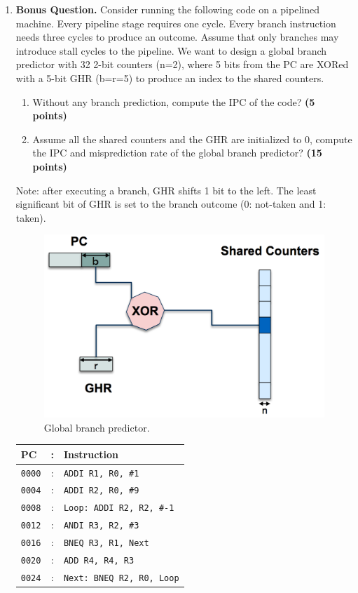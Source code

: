 \documentclass[a4paper, 11pt]{exam}
\begin{document}
\begin{enumerate}
\item \textbf{Bonus Question.}
Consider running the following code on a pipelined machine. Every pipeline stage requires one cycle. Every branch instruction needs three cycles to produce an outcome. Assume that only branches may introduce stall cycles to the pipeline.
We want to design a global branch predictor with 32 2-bit counters (n=2), where 5 bits from the PC are XORed with a 5-bit GHR (b=r=5) to produce an index to the shared counters.
\begin{enumerate}
	\item  Without any branch prediction, compute the IPC of the code? \textbf {(5 points)}
	\item  Assume all the shared counters and the GHR are initialized to 0, compute the IPC and misprediction rate of the global branch predictor? \textbf{(15 points)}
\end{enumerate}
Note: after executing a branch, GHR shifts 1 bit to the left. The least significant bit of GHR is set to the branch outcome (0: not-taken and 1: taken).

\begin{figure}[!h]
	\centering
	\includegraphics[width=0.5\linewidth]{q5}
	\caption{Global branch predictor.}
	\label{fig:q5}
\end{figure}


\begin{tabular}{lcl}
\textbf{PC} & : & \textbf{Instruction}\\
\hline
\texttt{0000} & : & \hspace{40pt}\texttt{ADDI R1, R0, \#1}\\
\texttt{0004} & : & \hspace{40pt}\texttt{ADDI R2, R0, \#9}\\
\texttt{0008} & : & \texttt{Loop: ADDI R2, R2, \#-1}\\
\texttt{0012} & : & \hspace{40pt}\texttt{ANDI R3, R2, \#3}\\
\texttt{0016} & : & \hspace{40pt}\texttt{BNEQ R3, R1, Next}\\
\texttt{0020} & : & \hspace{40pt}\texttt{ADD R4, R4, R3}\\
\texttt{0024} & : & \texttt{Next: BNEQ R2, R0, Loop}
\end{tabular}

\end{enumerate}
\end{document}

